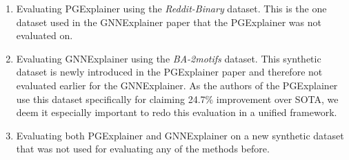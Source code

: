 \documentclass{article}
\begin{document}
\begin{enumerate}
    \item Evaluating PGExplainer using the \textit{Reddit-Binary} dataset. This is the one dataset used in the GNNExplainer paper that the PGExplainer was not evaluated on.
    \item Evaluating GNNExplainer using the \textit{BA-2motifs} dataset. This synthetic dataset is newly introduced in the PGExplainer paper and therefore not evaluated earlier for the GNNExplainer. As the authors of the PGExplainer use this dataset specifically for claiming 24.7\% improvement over SOTA, we deem it especially important to redo this evaluation in a unified framework. 
    \item Evaluating both PGExplainer and GNNExplainer on a new synthetic dataset that was not used for evaluating any of the methods before. 
\end{enumerate}



\end{document}
